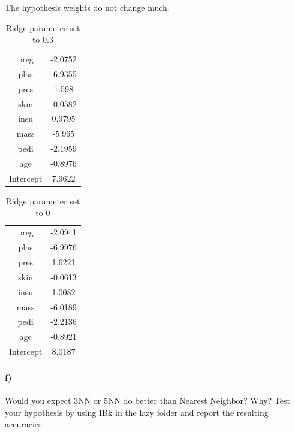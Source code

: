 \documentclass{article}
\begin{document}
The hypothesis weights do not change  much. 


\begin{table}[ht]
    \begin{center}
    \begin{tabular}{|c|c|}
   \hline
   
preg        &         -2.0752\\
plas        &         -6.9355\\
pres        &           1.598\\
skin         &        -0.0582\\
insu         &         0.9795\\
mass            &      -5.965\\
pedi              &   -2.1959\\
age                &  -0.8976\\   \hline
Intercept         &    7.9622 \\   \hline
    \end{tabular} \caption{Ridge parameter set to 0.3}
    \end{center}
\end{table}

\begin{table}[ht]
    \begin{center}
    \begin{tabular}{|c|c|}
   \hline
preg               &  -2.0941\\
plas                & -6.9976\\
pres           &       1.6221\\
skin          &       -0.0613\\
insu         &         1.0082\\
mass       &          -6.0189\\
pedi        &         -2.2136\\
age           &       -0.8921\\   \hline
Intercept     &        8.0187\\   \hline
    \end{tabular} \caption{Ridge parameter set to 0}
    \end{center}
\end{table}
\paragraph{f)}
Would you expect 3NN or 5NN do better than Nearest Neighbor? Why? Test your hypothesis by using IBk in the lazy folder and report the resulting accuracies.
\end{document}

